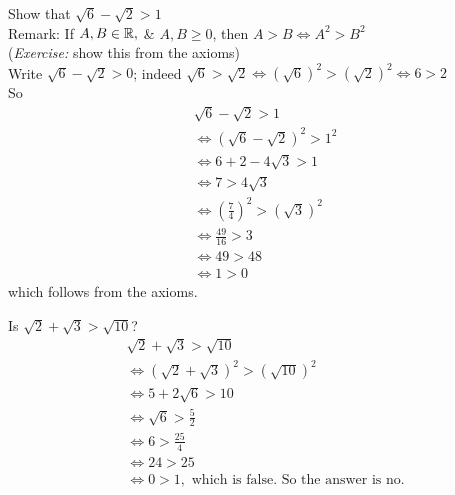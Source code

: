 \documentclass[twoside]{scrartcl}
\begin{document}
\begin{example} 
Show that $\sqrt{6} - \sqrt{2} > 1$\\

Remark: If $A, B \in \mathbb{R},$ \& $A,B \geq 0$, then $A >B \iff A^2 > B^2$ \\(\emph{Exercise:} show this from the axioms)\\

Write $\sqrt{6} - \sqrt{2} > 0 $; indeed $\sqrt{6} > \sqrt{2} \iff (\sqrt{6})^2 > (\sqrt{2})^2 \iff 6 > 2$\\

So 
\[\begin{aligned}
 &\sqrt{6} - \sqrt{2} > 1\\
&\iff (\sqrt{6} - \sqrt{2})^2 > 1^2 \\
& \iff 6 + 2 - 4\sqrt{3} > 1 \\
&\iff 7 > 4\sqrt{3} \\
& \iff (\frac{7}{4})^2 > (\sqrt{3})^2 \\
& \iff \frac{49}{16} > 3 \\
& \iff 49 > 48 \\
& \iff 1 > 0
\end{aligned}\]which follows from the axioms. 
\end{example}\vspace*{10pt}

\begin{example}
Is $\sqrt{2} + \sqrt{3} > \sqrt{10}$? 
\[
\begin{aligned}
  &\sqrt{2} + \sqrt{3} > \sqrt{10} \\
  &\iff (\sqrt{2} + \sqrt{3})^2 > (\sqrt{10})^2 \\
  &\iff 5 + 2\sqrt{6} > 10 \\
  &\iff \sqrt{6} > \frac{5}{2}\\
  &\iff 6 > \frac{25}{4} \\
  &\iff 24 > 25 \\
  &\iff 0 > 1, \text{ which is false. So the answer is no.}
\end{aligned}
\]
\end{example}\vspace*{10pt}
\end{document}
